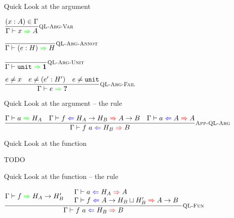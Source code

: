 \documentclass{beamer}
\begin{document}
\begin{frame}{Quick Look at the argument}

\begin{center}
  $\infrule[QL-Arg-Var]{\sidecond{(x : A) \in \Gamma}}{\quicklookinfer{x}{A}}$

  \vspace{2em}

  $\infrule[QL-Arg-Annot]{}{\quicklookinfer{\annot{e}{H}}{H}}$

  \vspace{2em}

  $\infrule[QL-Arg-Unit]{}{\quicklookinfer{\unit}{\Unit}}$

  \vspace{2em}

  $\infrule[QL-Arg-Fail]{\sidecond{e \neq x} \quad \sidecond{e \neq \annot{e'}{H'}} \quad \sidecond{e \neq \unit}}{\quicklookinfer{e}{\Hole}}$
\end{center}

\end{frame}

\begin{frame}{Quick Look at the argument -- the rule}

\begin{center}
  $\infrule[App-QL-Arg]{\quicklookinfer{a}{H_A} \quad \hinting{f}{\Fun{H_A}{H_B}}{\Fun{A}{B}} \quad \hinting{a}{A}{A}}{\hinting{\app{f}{a}}{H_B}{B}}$
\end{center}

\end{frame}

\begin{frame}{Quick Look at the function}

TODO

\end{frame}

\begin{frame}{Quick Look at the function -- the rule}

\begin{center}
  $\infrule[QL-Fun]{\quicklookinfer{f}{\Fun{H_A}{H_B'}} \quad \begin{array}{l} \hinting{a}{H_A}{A} \\ \hinting{f}{\Fun{A}{\hintlub{H_B}{H_B'}}}{\Fun{A}{B}} \end{array}}{\hinting{\app{f}{a}}{H_B}{B}}$
\end{center}

\end{frame}
\end{document}
